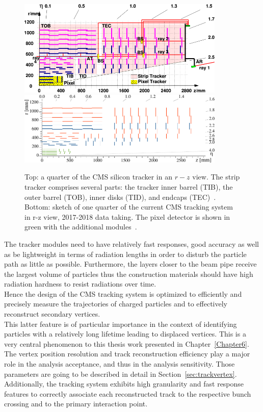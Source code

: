 \begin{figure}[h]
\centering
\includegraphics[width=0.88\textwidth]{Figures/c2/las}\\
\vspace{0.5cm}
\includegraphics[width=0.88\textwidth]{Figures/c2/Phase1_Tracker_1Quarter.pdf}
\vspace{0.5cm}

\caption{Top: a quarter of the CMS silicon tracker in an $r-z$
  view. The strip tracker comprises several parts: the tracker inner
  barrel (TIB), the outer barrel (TOB), inner disks (TID), and endcaps
  (TEC)~\cite{Adam:1171503}. Bottom:
sketch of one quarter of the current CMS tracking system in
  r-z view, 2017-2018 data taking. The pixel detector is shown in
  green with the additional modules~\cite{trackingPU}.}
\label{fig:tracker}
\end{figure} 

The tracker modules need to have relatively fast responses, good
accuracy as well as be lightweight in terms of radiation lengths in
order to disturb the particle path as little as possible. Furthermore,
the layers closer to the beam pipe receive
the largest volume of particles thus the construction materials should
have high radiation hardness to resist radiations over time.\\
Hence the design of the CMS tracking system is optimized to
efficiently and precisely measure the trajectories of charged
particles and to effectively reconstruct secondary vertices.\\
This latter feature is of particular
importance in the context of identifying particles with a relatively
long lifetime leading to displaced vertices. This is a very central phenomenon
to this thesis work presented in Chapter~\ref{Chapter6}. The vertex position resolution and track
reconstruction efficiency play a major role in the analysis acceptance,
and thus in the analysis sensitivity. Those parameters are going to be
described in detail in Section~\ref{sec:trackvertex}.\\
Additionally, the tracking system exhibits high granularity and
fast response features to correctly associate each reconstructed track
to the respective bunch crossing and to the primary interaction point.

